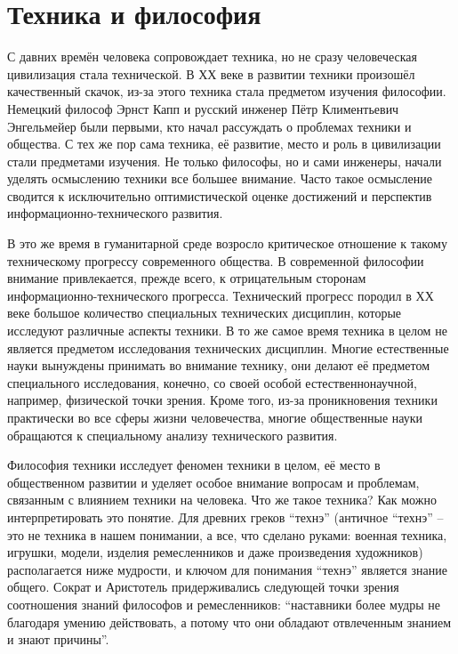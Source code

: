 \section{Техника и философия}
С давних времён человека сопровождает техника, но не сразу человеческая цивилизация стала технической. В ХХ веке в развитии техники произошёл качественный скачок, из-за этого техника стала предметом изучения философии. Немецкий философ Эрнст Капп и русский инженер Пётр Климентьевич Энгельмейер были первыми, кто начал рассуждать о проблемах техники и общества. С тех же пор сама техника, её развитие, место и роль в цивилизации стали предметами изучения. Не только философы, но и сами инженеры, начали уделять осмыслению техники все большее внимание. Часто такое осмысление сводится к исключительно оптимистической оценке достижений и перспектив ин\-фор\-ма\-цион\-но-тех\-ни\-чес\-ко\-го развития. 

В это же время в гуманитарной среде возросло критическое отношение к такому техническому прогрессу современного общества. В современной философии внимание привлекается, прежде всего, к отрицательным сторонам информационно-технического прогресса.  Технический прогресс породил в ХХ веке большое количество специальных технических дисциплин, которые исследуют различные аспекты техники. В то же самое время техника в целом не является предметом исследования технических дисциплин. Многие естественные науки вынуждены принимать во внимание технику, они делают её предметом специального исследования, конечно, со своей особой естественнонаучной, например, физической точки зрения. Кроме того, из-за проникновения техники практически во все сферы жизни человечества, многие общественные науки обращаются к специальному анализу технического развития. 

Философия техники исследует феномен техники в целом, её место в общественном развитии и уделяет особое внимание вопросам и проблемам, связанным с влиянием техники на человека.  Что же такое техника? Как можно интерпретировать это понятие. Для древних греков ``технэ'' (античное ``технэ'' – это не техника в нашем понимании, а все, что сделано руками: военная техника, игрушки, модели, изделия ремесленников и даже произведения художников) располагается ниже мудрости, и ключом для понимания ``технэ'' является знание общего. Сократ и Аристотель придерживались следующей точки зрения соотношения знаний философов и ремесленников: ``наставники более мудры не благодаря умению действовать, а потому что они обладают отвлеченным знанием и знают причины''.


